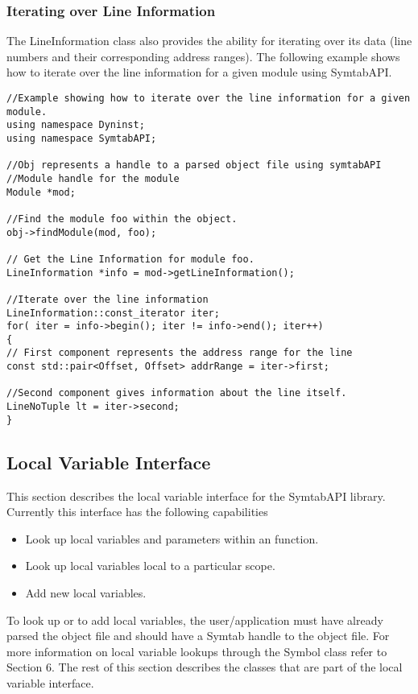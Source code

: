\subsubsection{Iterating over Line Information}
The LineInformation class also provides the ability for iterating over its data (line numbers and their corresponding address ranges). The following example shows how to iterate over the line information for a given module using SymtabAPI.

\begin{lstlisting}
//Example showing how to iterate over the line information for a given module.
using namespace Dyninst;
using namespace SymtabAPI;

//Obj represents a handle to a parsed object file using symtabAPI
//Module handle for the module
Module *mod;

//Find the module foo within the object.
obj->findModule(mod, foo);

// Get the Line Information for module foo.
LineInformation *info = mod->getLineInformation();

//Iterate over the line information
LineInformation::const_iterator iter;
for( iter = info->begin(); iter != info->end(); iter++)
{
// First component represents the address range for the line
const std::pair<Offset, Offset> addrRange = iter->first;

//Second component gives information about the line itself.
LineNoTuple lt = iter->second;
}
\end{lstlisting}

\subsection{Local Variable Interface}

This section describes the local variable interface for the SymtabAPI library. Currently this interface has the following capabilities
\begin{itemize}
    \item Look up local variables and parameters within an function.
    \item Look up local variables local to a particular scope.
    \item Add new local variables.
\end{itemize}

To look up or to add local variables, the user/application must have already parsed the object file and should have a Symtab handle to the object file. For more information on local variable lookups through the Symbol class refer to Section 6. The rest of this section describes the classes that are part of the local variable interface.

